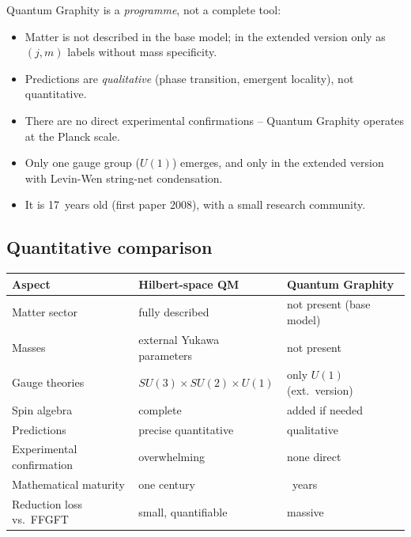 Quantum Graphity is a \emph{programme}, not a complete tool:
\begin{itemize}[leftmargin=2em,itemsep=2pt,topsep=2pt]
  \item Matter is not described in the base model; in the extended
        version only as $(j, m)$ labels without mass specificity.
  \item Predictions are \emph{qualitative} (phase transition,
        emergent locality), not quantitative.
  \item There are no direct experimental confirmations -- Quantum
        Graphity operates at the Planck scale.
  \item Only one gauge group ($U(1)$) emerges, and only in the
        extended version with Levin-Wen string-net condensation.
  \item It is 17~years old (first paper 2008), with a small research
        community.
\end{itemize}

\subsection{Quantitative comparison}

\begin{center}
\renewcommand{\arraystretch}{1.4}
{\small
\begin{tabular}{>{\raggedright\arraybackslash}p{3.4cm}>{\raggedright\arraybackslash}p{3.4cm}>{\raggedright\arraybackslash}p{3.4cm}}
\toprule
\textbf{Aspect} & \textbf{Hilbert-space QM} & \textbf{Quantum Graphity} \\
\midrule
Matter sector & fully described & not present (base model) \\[3pt]
Masses & external Yukawa parameters & not present \\[3pt]
Gauge theories & $SU(3)\!\times\!SU(2)\!\times\!U(1)$ & only $U(1)$ (ext.\ version) \\[3pt]
Spin algebra & complete & added if needed \\[3pt]
Predictions & precise quantitative & qualitative \\[3pt]
Experimental confirmation & overwhelming & none direct \\[3pt]
Mathematical maturity & one century & 17~years \\[3pt]
Reduction loss vs.\ FFGFT & small, quantifiable & massive \\
\bottomrule
\end{tabular}
}
\renewcommand{\arraystretch}{1.0}
\end{center}

